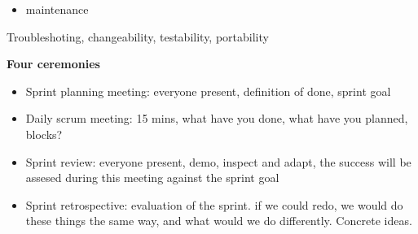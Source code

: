 \documentclass{article}
\begin{document}
\begin{flushleft}
    \begin{itemize}
        \item maintenance
    \end{itemize}
    Troubleshoting, changeability, testability, portability
    


    \bigskip


    \textbf{Four ceremonies}\par
    \begin{itemize}
        \item Sprint planning meeting: everyone present, definition of done, sprint goal
        \item Daily scrum meeting: 15 mins, what have you done, what have you planned, blocks?
        \item Sprint review: everyone present, demo, inspect and adapt, the success will be assesed during this meeting against the sprint goal
        \item Sprint retrospective: evaluation of the sprint. if we could redo, we would do these things the same way, and what would we do differently. Concrete ideas. 
    \end{itemize}



    


\end{flushleft}    
\end{document}
